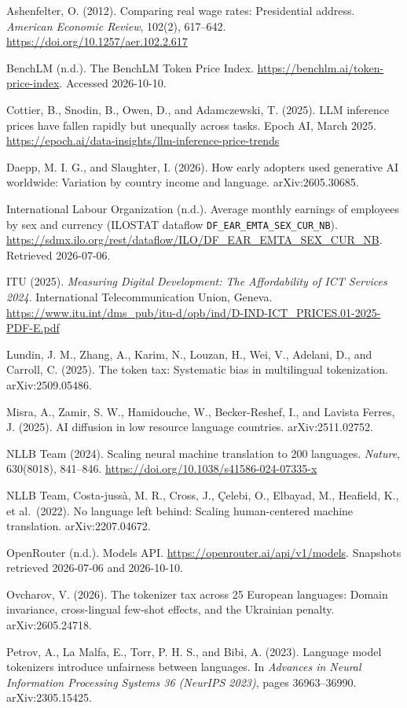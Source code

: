 \documentclass[11pt]{article}
\begin{document}
Ashenfelter, O. (2012). Comparing real wage rates: Presidential address. \emph{American Economic Review}, 102(2), 617--642. \url{https://doi.org/10.1257/aer.102.2.617}

BenchLM (n.d.). The BenchLM Token Price Index. \url{https://benchlm.ai/token-price-index}. Accessed 2026-10-10.

Cottier, B., Snodin, B., Owen, D., and Adamczewski, T. (2025). LLM inference prices have fallen rapidly but unequally across tasks. Epoch AI, March 2025. \url{https://epoch.ai/data-insights/llm-inference-price-trends}

Daepp, M. I. G., and Slaughter, I. (2026). How early adopters used generative AI worldwide: Variation by country income and language. arXiv:2605.30685.

International Labour Organization (n.d.). Average monthly earnings of employees by sex and currency (ILOSTAT dataflow \texttt{DF\_EAR\_EMTA\_SEX\_CUR\_NB}). \url{https://sdmx.ilo.org/rest/dataflow/ILO/DF_EAR_EMTA_SEX_CUR_NB}. Retrieved 2026-07-06.

ITU (2025). \emph{Measuring Digital Development: The Affordability of ICT Services 2024}. International Telecommunication Union, Geneva. \url{https://www.itu.int/dms_pub/itu-d/opb/ind/D-IND-ICT_PRICES.01-2025-PDF-E.pdf}

Lundin, J. M., Zhang, A., Karim, N., Louzan, H., Wei, V., Adelani, D., and Carroll, C. (2025). The token tax: Systematic bias in multilingual tokenization. arXiv:2509.05486.

Misra, A., Zamir, S. W., Hamidouche, W., Becker-Reshef, I., and Lavista Ferres, J. (2025). AI diffusion in low resource language countries. arXiv:2511.02752.

NLLB Team (2024). Scaling neural machine translation to 200 languages. \emph{Nature}, 630(8018), 841--846. \url{https://doi.org/10.1038/s41586-024-07335-x}

NLLB Team, Costa-jussà, M. R., Cross, J., Çelebi, O., Elbayad, M., Heafield, K., et al.~(2022). No language left behind: Scaling human-centered machine translation. arXiv:2207.04672.

OpenRouter (n.d.). Models API. \url{https://openrouter.ai/api/v1/models}. Snapshots retrieved 2026-07-06 and 2026-10-10.

Ovcharov, V. (2026). The tokenizer tax across 25 European languages: Domain invariance, cross-lingual few-shot effects, and the Ukrainian penalty. arXiv:2605.24718.

Petrov, A., La Malfa, E., Torr, P. H. S., and Bibi, A. (2023). Language model tokenizers introduce unfairness between languages. In \emph{Advances in Neural Information Processing Systems 36 (NeurIPS 2023)}, pages 36963--36990. arXiv:2305.15425.
\end{document}
